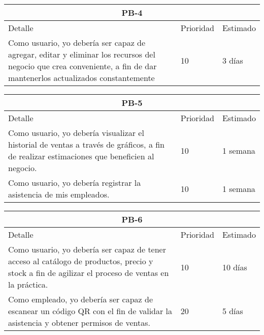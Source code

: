 \begin{table}[htbp]
	\begin{center}
		\begin{tabular}{|p{10cm} | p{2cm} | p{2cm}|}
			\hline
			\multicolumn{3}{|c|}{PB-4}\\
			\hline
			Detalle & Prioridad & Estimado \\
			\hline
			Como usuario, yo debería ser capaz de agregar, editar y eliminar los recursos del negocio que crea conveniente, a fin de dar mantenerlos actualizados constantemente& 10 & 3 días \\
			\hline	
		\end{tabular}
	\end{center}
\end{table}

\begin{table}[htbp]
	\begin{center}
		\begin{tabular}{|p{10cm} | p{2cm} | p{2cm}|}
			\hline
			\multicolumn{3}{|c|}{PB-5}\\
			\hline
			Detalle & Prioridad & Estimado \\
			\hline
			Como usuario, yo debería visualizar el historial de ventas a través de gráficos, a fin de realizar estimaciones que beneficien al negocio. & 10 & 1 semana \\
			\hline
			Como usuario, yo debería registrar la asistencia de mis empleados. & 10 & 1 semana \\
			\hline	
		\end{tabular}
	\end{center}
\end{table}

\begin{table}[htbp]
	\begin{center}
		\begin{tabular}{|p{10cm} | p{2cm} | p{2cm}|}
			\hline
			\multicolumn{3}{|c|}{PB-6}\\
			\hline
			Detalle & Prioridad & Estimado \\
			\hline
			Como usuario, yo debería ser capaz de tener acceso al catálogo de productos, precio y stock a fin de agilizar el proceso de ventas en la práctica. & 10 & 10 días \\
			\hline
			Como empleado, yo debería ser capaz de escanear un código QR con el fin de validar la asistencia y obtener permisos de ventas. & 20 & 5 días \\
			\hline	
		\end{tabular}
	\end{center}
\end{table}
